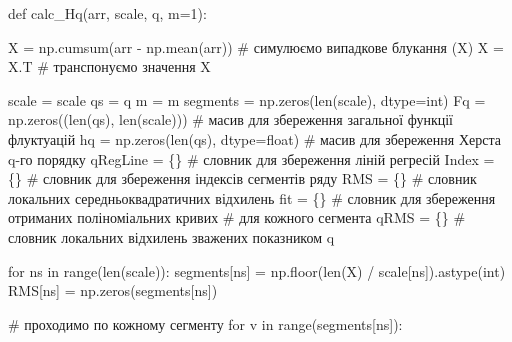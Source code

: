 \documentclass[
  letterpaper,
]{report}
\newenvironment{Shaded}{\begin{snugshade}}{\end{snugshade}}
\newcommand{\BuiltInTok}[1]{\textcolor[rgb]{0.00,0.23,0.31}{#1}}
\newcommand{\CommentTok}[1]{\textcolor[rgb]{0.37,0.37,0.37}{#1}}
\newcommand{\ControlFlowTok}[1]{\textcolor[rgb]{0.00,0.23,0.31}{#1}}
\newcommand{\DecValTok}[1]{\textcolor[rgb]{0.68,0.00,0.00}{#1}}
\newcommand{\KeywordTok}[1]{\textcolor[rgb]{0.00,0.23,0.31}{#1}}
\newcommand{\NormalTok}[1]{\textcolor[rgb]{0.00,0.23,0.31}{#1}}
\newcommand{\OperatorTok}[1]{\textcolor[rgb]{0.37,0.37,0.37}{#1}}
\begin{document}
\begin{Shaded}
\begin{Highlighting}[]
\KeywordTok{def}\NormalTok{ calc\_Hq(arr, scale, q, m}\OperatorTok{=}\DecValTok{1}\NormalTok{):}
    
\NormalTok{    X }\OperatorTok{=}\NormalTok{ np.cumsum(arr }\OperatorTok{{-}}\NormalTok{ np.mean(arr)) }\CommentTok{\# симулюємо випадкове блукання (X)}
\NormalTok{    X }\OperatorTok{=}\NormalTok{ X.T                           }\CommentTok{\# транспонуємо значення X}

\NormalTok{    scale }\OperatorTok{=}\NormalTok{ scale }
\NormalTok{    qs }\OperatorTok{=}\NormalTok{ q}
\NormalTok{    m }\OperatorTok{=}\NormalTok{ m}
\NormalTok{    segments }\OperatorTok{=}\NormalTok{ np.zeros(}\BuiltInTok{len}\NormalTok{(scale), dtype}\OperatorTok{=}\BuiltInTok{int}\NormalTok{) }
\NormalTok{    Fq }\OperatorTok{=}\NormalTok{ np.zeros((}\BuiltInTok{len}\NormalTok{(qs), }\BuiltInTok{len}\NormalTok{(scale)))       }\CommentTok{\# масив для збереження загальної функції флуктуацій }
\NormalTok{    hq }\OperatorTok{=}\NormalTok{ np.zeros(}\BuiltInTok{len}\NormalTok{(qs), dtype}\OperatorTok{=}\BuiltInTok{float}\NormalTok{)        }\CommentTok{\# масив для збереження Херста q{-}го порядку}
\NormalTok{    qRegLine }\OperatorTok{=}\NormalTok{ \{\} }\CommentTok{\# словник для збереження ліній регресій}
\NormalTok{    Index }\OperatorTok{=}\NormalTok{ \{\}    }\CommentTok{\# словник для збереження індексів сегментів ряду}
\NormalTok{    RMS }\OperatorTok{=}\NormalTok{ \{\}      }\CommentTok{\# словник локальних середньоквадратичних відхилень}
\NormalTok{    fit }\OperatorTok{=}\NormalTok{ \{\}      }\CommentTok{\# словник для збереження отриманих поліноміальних кривих}
                  \CommentTok{\# для кожного сегмента}
\NormalTok{    qRMS }\OperatorTok{=}\NormalTok{ \{\}     }\CommentTok{\# словник локальних відхилень зважених показником q}

    \ControlFlowTok{for}\NormalTok{ ns }\KeywordTok{in} \BuiltInTok{range}\NormalTok{(}\BuiltInTok{len}\NormalTok{(scale)):}
\NormalTok{        segments[ns] }\OperatorTok{=}\NormalTok{ np.floor(}\BuiltInTok{len}\NormalTok{(X) }\OperatorTok{/}\NormalTok{ scale[ns]).astype(}\BuiltInTok{int}\NormalTok{)}
\NormalTok{        RMS[ns] }\OperatorTok{=}\NormalTok{ np.zeros(segments[ns])}

        \CommentTok{\# проходимо по кожному сегменту}
        \ControlFlowTok{for}\NormalTok{ v }\KeywordTok{in} \BuiltInTok{range}\NormalTok{(segments[ns]): }


\end{Highlighting}
\end{Shaded}
\end{document}
